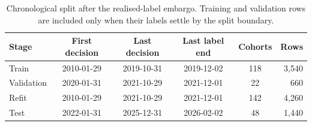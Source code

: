 \begin{table}[H]
\centering
\small
\begin{tabular}{lccccr}
\toprule
Stage & First decision & Last decision & Last label end & Cohorts & Rows \\
\midrule
Train & 2010-01-29 & 2019-10-31 & 2019-12-02 & 118 & 3,540 \\
Validation & 2020-01-31 & 2021-10-29 & 2021-12-01 & 22 & 660 \\
Refit & 2010-01-29 & 2021-10-29 & 2021-12-01 & 142 & 4,260 \\
Test & 2022-01-31 & 2025-12-31 & 2026-02-02 & 48 & 1,440 \\
\bottomrule
\end{tabular}
\caption{Chronological split after the realised-label embargo. Training and validation rows are included only when their labels settle by the split boundary.}
\label{tab:split}
\end{table}
